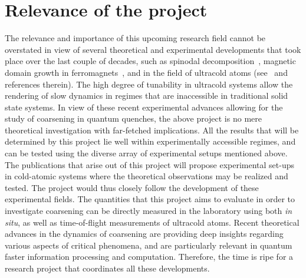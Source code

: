 \documentclass[a4paper,11pt,color]{article}
\begin{document}
\section{Relevance of the project}
\label{sec:timeliness}
The relevance and importance of this upcoming research field cannot be overstated in view of several theoretical and experimental developments that took place over the last couple of decades, such as spinodal decomposition~\cite{spinodal}, magnetic domain growth in ferromagnets~\cite{puri}, and in the field of ultracold atoms (see~\cite{ultracold, colrev, fermidyn,ncnsd2012} and references therein). The high degree of tunability in ultracold systems allow the rendering of slow dynamics in regimes that are inaccessible in traditional solid state systems. In view of these recent experimental advances allowing for the study of coarsening in quantum quenches, the above project is no mere theoretical investigation with far-fetched implications. All the results that will be determined by this project lie well within experimentally accessible regimes, and can be tested using the diverse array of experimental setups mentioned above. The publications that arise out of this project will propose experimental set-ups in 
cold-atomic systems where the theoretical observations may be
realized and tested. The project would thus closely follow the development of these experimental fields. The quantities that this project aims to evaluate in order to investigate coarsening can be directly measured in the laboratory using both \textit{in situ}, as well as time-of-flight measurements of ultracold atoms. Recent theoretical advances in the dynamics of coarsening are providing deep insights regarding various aspects of critical phenomena, and are particularly relevant in quantum faster information processing and computation. Therefore, the time is ripe for a research project that coordinates all these developments.
\end{document}
